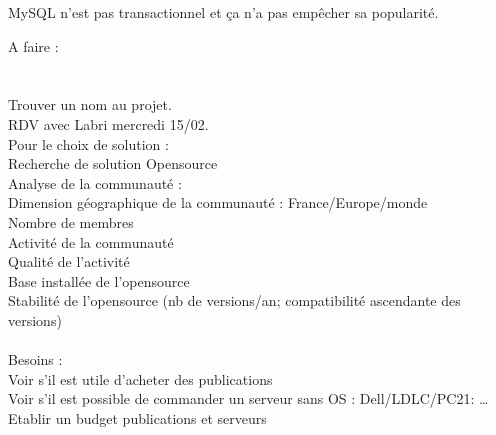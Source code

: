 MySQL n'est pas transactionnel et ça n'a pas empêcher sa popularité.

A faire :\\
\\\\
    Trouver un nom au projet.\\
    RDV avec Labri mercredi 15/02.\\
    Pour le choix de solution  :\\
        Recherche de solution Opensource\\
        Analyse de la communauté :\\
            Dimension géographique de la communauté : France/Europe/monde\\
            Nombre de membres\\
            Activité de la communauté\\
            Qualité de l'activité\\
            Base installée de l'opensource\\
            Stabilité de l'opensource (nb de versions/an; compatibilité ascendante des versions)\\
\\
    Besoins :\\
        Voir s'il est utile d'acheter des publications\\
        Voir s'il est possible de commander un serveur sans OS : Dell/LDLC/PC21: …\\
        Etablir un budget publications et serveurs\\
